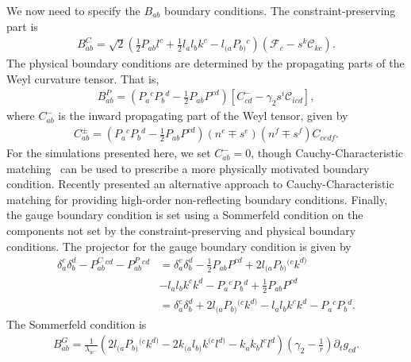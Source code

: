 \begin{bibunit}[unsrtnat]
We now need to specify the $B_{ab}$ boundary conditions. The
constraint-preserving part is
\begin{eqnarray}
  \label{eq:fosh gh bc constraint preserving}
  B_{ab}^C=\sqrt{2}\left(\frac{1}{2}P_{ab}l^c + \frac{1}{2}l_al_bk^c -
  l_{(a}P_{b)}{}^c\right)\left(\mathcal{F}_c-s^k\mathcal{C}_{kc}\right).
\end{eqnarray}
The physical boundary conditions are determined by the propagating parts of the
Weyl curvature tensor. That is,
\begin{eqnarray}
  \label{eq:fosh gh bc physical}
  B_{ab}^P=\left(P_a{}^cP_b{}^d-\frac{1}{2}P_{ab}P^{cd}\right)\left[C^-_{cd}
  -\gamma_2s^i\mathcal{C}_{icd}\right],
\end{eqnarray}
where $C^-_{ab}$ is the inward propagating part of the Weyl tensor, given by
\begin{eqnarray}
  \label{eq:fosh gh weyl propagating}
  C^{\pm}_{ab}=\left(P_a{}^cP_b{}^d-\frac{1}{2}P_{ab}P^{cd}\right)\left(n^e\mp
  s^e\right)\left(n^f\mp s^f\right)C_{cedf}.
\end{eqnarray}
For the simulations presented here, we set $C^-_{ab}=0$, though
Cauchy-Characteristic matching~\cite{Ma:2023qjn} can be used to prescribe a more
physically motivated boundary condition. Recently
\cite{Buchman:2024zsb} presented an alternative approach to
Cauchy-Characteristic matching for providing high-order non-reflecting boundary
conditions. Finally, the gauge boundary condition is set using a Sommerfeld
condition on the components not set by the constraint-preserving and physical
boundary conditions. The projector for the gauge boundary condition is given by
\begin{eqnarray}
  \label{eq:fosh gh bc gauge projection}
  \delta_a^c\delta_b^d-P^{C}_{ab}{}^{cd}-P^P_{ab}{}^{cd}
  &=\delta_a^c\delta_b^d-\frac{1}{2}P_{ab}P^{cd}+2l_{(a}P_{b)}{}^{(c}k^{d)}
    \nonumber \\
  &-l_al_bk^ck^d-P_a{}^cP_b{}^d+\frac{1}{2}P_{ab}P^{cd} \nonumber \\
  &=\delta_a^c\delta_b^d+2l_{(a}P_{b)}{}^{(c}k^{d)}
    -l_al_bk^ck^d-P_a{}^cP_b{}^d.
\end{eqnarray}
The Sommerfeld condition is
\begin{eqnarray}
  \label{eq:fosh gh bc gauge}
  B_{ab}^G=\frac{1}{\lambda_{w^-}}
  \left(2l_{(a}P_{b)}{}^{(c}k^{d)} - 2k_{(a}l_{b)}k^{(c}l^{d)}
  -k_ak_bl^cl^d\right)\left(\gamma_2 - \frac{1}{r}\right)\partial_t
  g_{cd}.
\end{eqnarray}


\end{bibunit}
